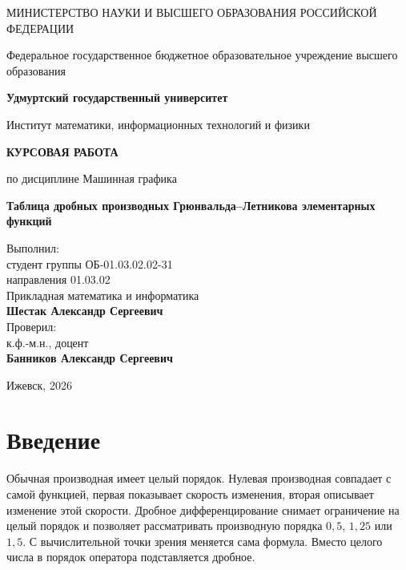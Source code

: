 \documentclass[14pt,a4paper]{extarticle}
\begin{document}
\begin{titlepage}
\centering
{\small МИНИСТЕРСТВО НАУКИ И ВЫСШЕГО ОБРАЗОВАНИЯ РОССИЙСКОЙ ФЕДЕРАЦИИ\par}
\vspace{2mm}
{\small Федеральное государственное бюджетное образовательное учреждение высшего образования\par}
{\small\bfseries \textquotedbl{}Удмуртский государственный университет\textquotedbl{}\par}
\vspace{8mm}
{\small Институт математики, информационных технологий и физики\par}
\vfill
{\Large\bfseries КУРСОВАЯ РАБОТА\par}
\vspace{3mm}
{по дисциплине \textquotedbl{}Машинная графика\textquotedbl{}\par}
\vspace{10mm}
{\large\bfseries Таблица дробных производных Грюнвальда--Летникова элементарных функций\par}
\vfill
\begin{flushright}
\begin{minipage}{0.62\textwidth}
Выполнил:\\
студент группы ОБ-01.03.02.02-31\\
направления 01.03.02\\
\textquotedbl{}Прикладная математика и информатика\textquotedbl{}\\
\textbf{Шестак Александр Сергеевич}\\[8mm]
Проверил:\\
к.ф.-м.н., доцент\\
\textbf{Банников Александр Сергеевич}
\end{minipage}
\end{flushright}
\vfill
{Ижевск, 2026\par}
\end{titlepage}

\setcounter{page}{2}
\tableofcontents
\newpage

{}
\section*{Введение}

Обычная производная имеет целый порядок. Нулевая производная совпадает с самой функцией, первая показывает скорость изменения, вторая описывает изменение этой скорости. Дробное дифференцирование снимает ограничение на целый порядок и позволяет рассматривать производную порядка $0{,}5$, $1{,}25$ или $1{,}5$. С вычислительной точки зрения меняется сама формула. Вместо целого числа в порядок оператора подставляется дробное.
\end{document}
